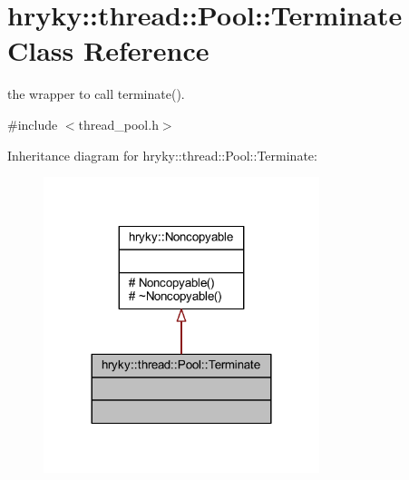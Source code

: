 \hypertarget{classhryky_1_1thread_1_1_pool_1_1_terminate}{\section{hryky\-:\-:thread\-:\-:Pool\-:\-:Terminate Class Reference}
\label{classhryky_1_1thread_1_1_pool_1_1_terminate}
}


the wrapper to call terminate().  




{\ttfamily \#include $<$thread\-\_\-pool.\-h$>$}



Inheritance diagram for hryky\-:\-:thread\-:\-:Pool\-:\-:Terminate\-:\nopagebreak
\begin{figure}[H]
\begin{center}
\leavevmode
\includegraphics[width=228pt]{classhryky_1_1thread_1_1_pool_1_1_terminate__inherit__graph}
\end{center}
\end{figure}
